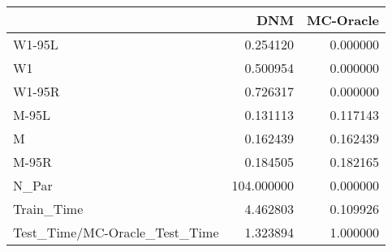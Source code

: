 \begin{tabular}{lrr}
\toprule
{} &         DNM &  MC-Oracle \\
\midrule
W1-95L                        &    0.254120 &   0.000000 \\
W1                            &    0.500954 &   0.000000 \\
W1-95R                        &    0.726317 &   0.000000 \\
M-95L                         &    0.131113 &   0.117143 \\
M                             &    0.162439 &   0.162439 \\
M-95R                         &    0.184505 &   0.182165 \\
N\_Par                         &  104.000000 &   0.000000 \\
Train\_Time                    &    4.462803 &   0.109926 \\
Test\_Time/MC-Oracle\_Test\_Time &    1.323894 &   1.000000 \\
\bottomrule
\end{tabular}

